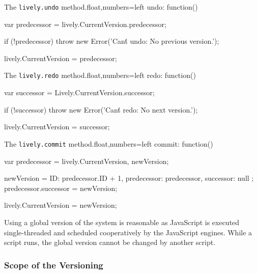 \begin{code}{The \lstinline{lively.undo} method.}{float,numbers=left}
undo: function() {
    var predecessor = lively.CurrentVersion.predecessor;
    
    if (!predecessor) {
        throw new Error('Can\'t undo: No previous version.');
    }
    
    lively.CurrentVersion = predecessor;
}
\end{code}
\iffalse
\end{verbatim}\fi

\begin{code}{The \lstinline{lively.redo} method.}{float,numbers=left}
redo: function() {
    var successor = Lively.CurrentVersion.successor;
    
    if (!successor) {
        throw new Error('Can\'t redo: No next version.');
    }
    
    lively.CurrentVersion = successor;
}
\end{code}
\iffalse
\end{verbatim}\fi

\begin{code}{The \lstinline{lively.commit} method.}{float,numbers=left}
commit: function() {
    var predecessor = lively.CurrentVersion,
        newVersion;
    
    newVersion = {
        ID: predecessor.ID + 1,
        predecessor: predecessor,
        successor: null
    };
    predecessor.successor = newVersion;
    
    lively.CurrentVersion = newVersion;
}
\end{code}
\iffalse
\end{verbatim}\fi

Using a global version of the system is reasonable as JavaScript is executed single-threaded and scheduled cooperatively by the JavaScript engines.
While a script runs, the global version cannot be changed by another script.

 
\subsubsection{Scope of the Versioning} \label{subsubsec:IMPLEMENTATION:5.2.1}

